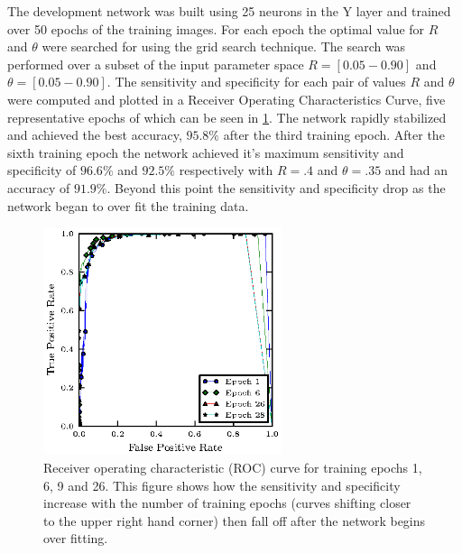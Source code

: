 \documentclass[conference]{IEEEtran}
\begin{document}
The development network was built using 25 neurons in the Y layer and trained over 50 epochs of the training images.  For each epoch the optimal value for $R$ and $\theta$ were searched for using the grid search technique.  The search was performed over a subset of the input parameter space $R=[0.05-0.90]$ and $\theta=[0.05-0.90]$.  The sensitivity and specificity for each pair of values $R$ and $\theta$ were computed and plotted in a Receiver Operating Characteristics Curve, five representative epochs of which can be seen in \ref{fig:roc}. The network rapidly stabilized and achieved the best accuracy, $95.8\%$ after the third training epoch.  After the sixth training epoch the network achieved it's maximum sensitivity and specificity of $96.6\%$ and $92.5\%$ respectively with $R=.4$ and $\theta=.35$ and had an accuracy of $91.9\%$.  Beyond this point the sensitivity and specificity drop as the network began to over fit the training data.  

\begin{figure}
\center
\fontsize{8}{12}\selectfont
\includegraphics[width=2.75in]{figs/roc}
\caption{Receiver operating characteristic (ROC) curve for training epochs 1, 6, 9 and 26.  This figure shows how the sensitivity and specificity increase with the number of training epochs (curves shifting closer to the upper right hand corner) then fall off after the network begins over fitting.}
\label{fig:roc}
\end{figure}
\end{document}
